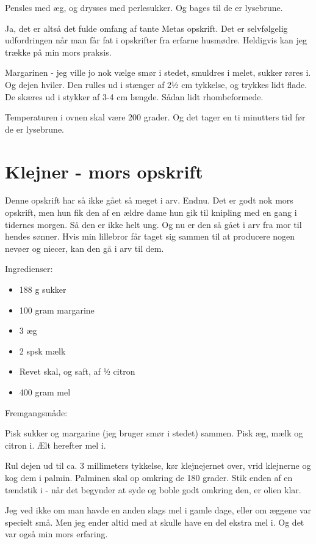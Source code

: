 \documentclass[
]{book}
\providecommand{\tightlist}{%
  \setlength{\itemsep}{0pt}\setlength{\parskip}{0pt}}
\begin{document}
Pensles med æg, og drysses med perlesukker. Og bages til de er lysebrune.

Ja, det er altså det fulde omfang af tante Metas opskrift. Det er selvfølgelig udfordringen når man får fat i opskrifter fra erfarne husmødre. Heldigvis kan jeg trække på min mors praksis.

Margarinen - jeg ville jo nok vælge smør i stedet, smuldres i melet, sukker røres i. Og dejen hviler. Den rulles ud i stænger af 2½ cm tykkelse, og trykkes lidt flade. De skæres ud i stykker af 3-4 cm længde. Sådan lidt rhombeformede.

Temperaturen i ovnen skal være 200 grader. Og det tager en ti minutters tid før de er lysebrune.

\section{Klejner - mors opskrift}\label{klejner---mors-opskrift}

Denne opskrift har så ikke gået så meget i arv. Endnu. Det er godt nok mors opskrift, men hun fik den af en ældre dame hun gik til knipling med en gang i tidernes morgen. Så den er ikke helt ung. Og nu er den så gået i arv fra mor til hendes sønner. Hvis min lillebror får taget sig sammen til at producere nogen nevøer og niecer, kan den gå i arv til dem.

Ingredienser:

\begin{itemize}
\tightlist
\item
  188 g sukker
\item
  100 gram margarine
\item
  3 æg
\item
  2 spsk mælk
\item
  Revet skal, og saft, af ½ citron
\item
  400 gram mel
\end{itemize}

Fremgangsmåde:

Pisk sukker og margarine (jeg bruger smør i stedet) sammen.
Pisk æg, mælk og citron i.
Ælt herefter mel i.

Rul dejen ud til ca. 3 millimeters tykkelse, kør klejnejernet over, vrid klejnerne og kog dem i palmin. Palminen skal op omkring de 180 grader. Stik enden af en tændstik i - når det begynder at syde og boble godt omkring den, er olien klar.

Jeg ved ikke om man havde en anden slags mel i gamle dage, eller om æggene var specielt små. Men jeg ender altid med at skulle have en del ekstra mel i. Og det var også min mors erfaring.
\end{document}
